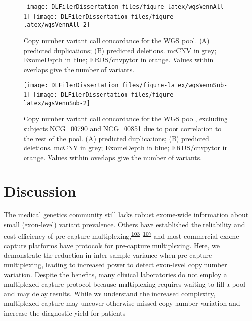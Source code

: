 \documentclass[11pt,letterpaper]{book}
\begin{document}
\begin{figure}

{\centering \texttt{[image: DLFilerDissertation\_files/figure-latex/wgsVennAll-1]} \texttt{[image: DLFilerDissertation\_files/figure-latex/wgsVennAll-2]} 

}

\caption[Copy number variant call concordance for the WGS pool.]{Copy number variant call concordance for the WGS pool. (A) predicted duplications; (B) predicted deletions. mcCNV in grey; ExomeDepth in blue; ERDS/cnvpytor in orange. Values within overlaps give the number of variants.}\label{fig:wgsVennAll}
\end{figure}



\begin{figure}

{\centering \texttt{[image: DLFilerDissertation\_files/figure-latex/wgsVennSub-1]} \texttt{[image: DLFilerDissertation\_files/figure-latex/wgsVennSub-2]} 

}

\caption[Copy number variant call concordance for the WGS pool, excluding subjects NCG\_00790 and NCG\_00851 due to poor correlation to the rest of the pool.]{Copy number variant call concordance for the WGS pool, excluding subjects NCG\_00790 and NCG\_00851 due to poor correlation to the rest of the pool. (A) predicted duplications; (B) predicted deletions. mcCNV in grey; ExomeDepth in blue; ERDS/cnvpytor in orange. Values within overlaps give the number of variants.}\label{fig:wgsVennSub}
\end{figure}

\hypertarget{discussion}{%
\section{Discussion}\label{discussion}}

The medical genetics community still lacks robust exome-wide information about small (exon-level) variant prevalence.
Others have established the reliability and cost-efficiency of pre-capture multiplexing,\textsuperscript{\protect\hyperlink{ref-neiman:2012aa}{103}--\protect\hyperlink{ref-shearer:2012aa}{107}} and most commercial exome capture platforms have protocols for pre-capture multiplexing.
Here, we demonstrate the reduction in inter-sample variance when pre-capture multiplexing, leading to increased power to detect exon-level copy number variation.
Despite the benefits, many clinical laboratories do not employ a multiplexed capture protocol because multiplexing requires waiting to fill a pool and may delay results.
While we understand the increased complexity, multiplexed capture may uncover otherwise missed copy number variation and increase the diagnostic yield for patients.
\end{document}
